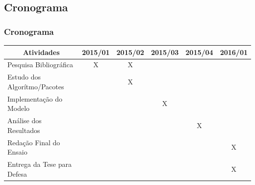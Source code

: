 \documentclass[aspectratio=169]{beamer}
\begin{document}
\subsection{Cronograma}

\begin{frame}\frametitle{Cronograma}
\begin{table}[h]
\begin{tabular}{llllll}
\hline
\multicolumn{1}{c}{\textbf{Atividades}} & 2015/01               & 2015/02               & 2015/03               & 2015/04               & 2016/01               \\ \hline
Pesquisa Bibliográfica                  & \multicolumn{1}{c}{X} & \multicolumn{1}{c}{X} &                       &                       &                       \\
Estudo dos Algorítmo/Pacotes            &                       & \multicolumn{1}{c}{X} &                       &                       &                       \\
Implementação do Modelo                 &                       &                       & \multicolumn{1}{c}{X} &                       &                       \\
Análise dos Resultados                  &                       &                       &                       & \multicolumn{1}{c}{X} &                       \\
Redação Final do Ensaio                  &                       &                       &                       &                       & \multicolumn{1}{c}{X} \\
Entrega da Tese para Defesa             &                       &                       &                       &                       & \multicolumn{1}{c}{X} \\ \hline
\end{tabular}
\end{table}
\end{frame}
\end{document}
